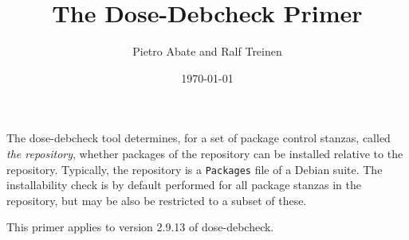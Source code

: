 \documentclass{article}
\title{The Dose-Debcheck Primer}
\author{Pietro Abate and Ralf Treinen}
\date{\today}
\newcommand{\debcheck}{dose-debcheck}
\begin{document}
\maketitle

The \debcheck{} tool determines, for a set of package control stanzas,
called \emph{the repository}, whether packages of the repository can
be installed relative to the repository. Typically, the repository is
a \texttt{Packages} file of a Debian suite. The installability check
is by default performed for all package stanzas in the repository, but
may be also be restricted to a subset of these.

This primer applies to version 2.9.13 of \debcheck. 

\tableofcontents












\end{document}
